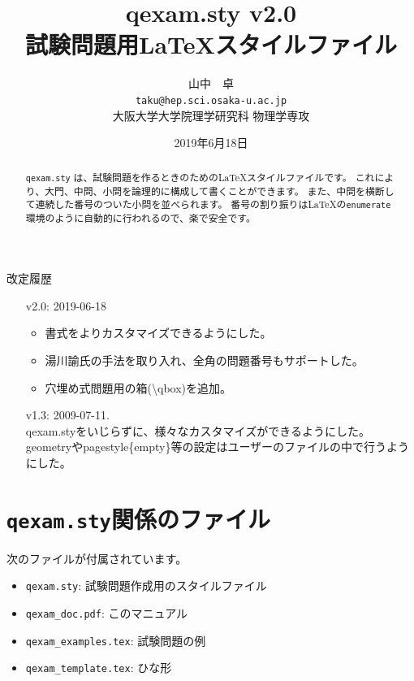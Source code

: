 \documentclass[dvipdfmx,a4j,11pt]{jarticle}
\title{{\bf qexam.sty} v2.0\\
試験問題用\LaTeX スタイルファイル}
\author{山中　卓\\
{\tt taku@hep.sci.osaka-u.ac.jp}\\
大阪大学大学院理学研究科 物理学専攻}
\date{2019年6月18日}                                           %
\begin{document}
\maketitle
\begin{abstract}
	\texttt{qexam.sty} は、試験問題を作るときのための\LaTeX スタイルファイルです。
	これにより、大門、中問、小問を論理的に構成して書くことができます。
	また、中問を横断して連続した番号のついた小問を並べられます。
	番号の割り振りは\LaTeX の{\tt enumerate}環境のように自動的に行われるので、楽で安全です。
\end{abstract}

改定履歴
\begin{itemize}
	\item [v2.0:] 2019-06-18
		\begin{itemize}
			\item 書式をよりカスタマイズできるようにした。
			\item 湯川諭氏の手法を取り入れ、全角の問題番号もサポートした。
			\item 穴埋め式問題用の箱(\textbackslash qbox)を追加。
		\end{itemize}
	\item[v1.3:] 2009-07-11.\\
			 qexam.styをいじらずに、様々なカスタマイズができるようにした。\\
			 geometryやpagestyle\{empty\}等の設定はユーザーのファイルの中で行うようにした。
\end{itemize}

\clearpage
\tableofcontents
\clearpage

\section{{\tt qexam.sty}関係のファイル}
	次のファイルが付属されています。
	\begin{itemize}
		\item {\tt qexam.sty}: 試験問題作成用のスタイルファイル
		\item {\tt qexam\_doc.pdf}: このマニュアル
		\item {\tt qexam\_examples.tex}: 試験問題の例
		\item {\tt qexam\_template.tex}: ひな形
	\end{itemize}
	
\end{document}
